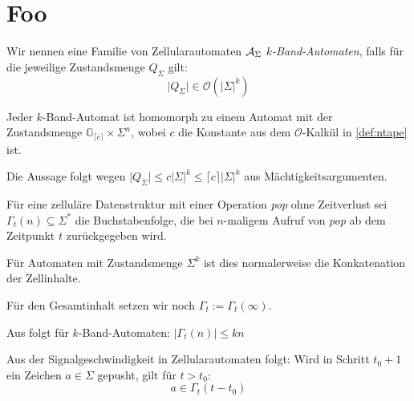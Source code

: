 \documentclass{article}
\begin{document}
\newcommand{\ca}{\ensuremath\mathcal{A}}
\newcommand{\abs}[1]{\lvert#1\rvert}
\newcommand{\ceil}[1]{\lceil#1\rceil}
\newcommand{\zrange}[1]{\mathbb{G}_{#1}}

\section{Foo}

\begin{definition}
    Wir nennen eine Familie von Zellularautomaten $\ca_\Sigma$ \emph{$k$-Band-Automaten}, falls für die jeweilige Zustandsmenge $Q_\Sigma$ gilt:
    \begin{equation}
        \abs{Q_\Sigma} \in \mathcal{O}(\abs{\Sigma}^k) \label{def:ntape}
    \end{equation}
\end{definition}

\begin{satz}
    \label{thm:tape-hom}
    Jeder $k$-Band-Automat ist homomorph zu einem Automat mit der Zustandsmenge $\zrange{\ceil{c}} \times \Sigma^n$, wobei $c$ die Konstante aus dem $\mathcal{O}$-Kalkül in \eqref{def:ntape} ist.

    \begin{beweis}
        Die Aussage folgt wegen $\abs{Q_\Sigma} \leq c \abs{\Sigma}^k \leq \ceil{c} \abs{\Sigma}^k$ aus Mächtigkeitsargumenten.
    \end{beweis}
\end{satz}

\begin{definition}
    Für eine zelluläre Datenstruktur mit einer Operation \emph{pop} ohne Zeitverlust sei $\Gamma_t(n) \subseteq \Sigma^*$ die Buchstabenfolge, die bei $n$-maligem Aufruf von \emph{pop} ab dem Zeitpunkt $t$ zurückgegeben wird.

    Für Automaten mit Zustandsmenge $\Sigma^k$ ist dies normalerweise die Konkatenation der Zellinhalte.
\end{definition}
    Für den Gesamtinhalt setzen wir noch $\Gamma_t := \Gamma_t(\infty)$.
\begin{korollar}
    \label{cor:spacesize}
    Aus  folgt für $k$-Band-Automaten: $\abs{\Gamma_t(n)} \leq kn$
\end{korollar}

\begin{korollar}
    \label{cor:signalpush}
    Aus der Signalgeschwindigkeit in Zellularautomaten folgt: Wird in Schritt $t_0+1$ ein Zeichen $a \in \Sigma$ gepusht, gilt für $t > t_0$:
    \begin{equation}
        a \in \Gamma_t(t-t_0) \label{cor:signal}
    \end{equation}
\end{korollar}
\end{document}

